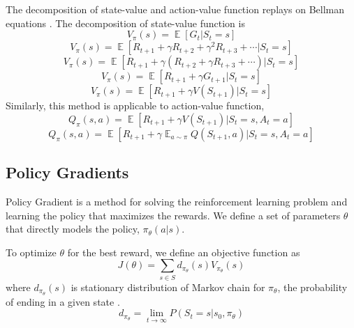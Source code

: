         The decomposition of state-value and action-value function replays on Bellman equations \cite{bellman-eq}. The decomposition of state-value function is
        \begin{equation}
            V_{\pi}(s) = \mathop{\mathbb{E}}[G_t|S_t = s]
        \end{equation}
        \begin{equation}
            V_{\pi}(s) = \mathop{\mathbb{E}}[R_{t+1} + \gamma R_{t+2} + \gamma^2 R_{t+3} + \cdots |S_t = s]
        \end{equation}
        \begin{equation}
            V_{\pi}(s) = \mathop{\mathbb{E}}[R_{t+1} + \gamma(R_{t+2} + \gamma R_{t+3} + \cdots) |S_t = s]
        \end{equation}
        \begin{equation}
            V_{\pi}(s) = \mathop{\mathbb{E}}[R_{t+1} + \gamma G_{t+1} |S_t = s]
        \end{equation}
        \begin{equation}
            V_{\pi}(s) = \mathop{\mathbb{E}}[R_{t+1} + \gamma V(S_{t+1}) |S_t = s]
        \end{equation}
        Similarly, this method is applicable to action-value function,
        \begin{equation}
            Q_{\pi}(s, a) = \mathop{\mathbb{E}}[R_{t+1} + \gamma V(S_{t+1}) |S_t = s, A_t = a]
        \end{equation}
        \begin{equation}
            Q_{\pi}(s, a) = \mathop{\mathbb{E}}[R_{t+1} + \gamma \mathop{\mathbb{E}}_{a \sim \pi} Q(S_{t+1}, a) |S_t = s, A_t = a]
        \end{equation}
    
        \subsection{Policy Gradients}
        Policy Gradient \cite{policy-gradient} is a method for solving the reinforcement learning problem and learning the policy that maximizes the rewards. We define a set of parameters $\theta$ that directly models the policy, $\pi_{\theta}(a|s)$.
    
        To optimize $\theta$ for the best reward, we define an objective function \cite{policy-gradient} as
        \begin{equation}
            J(\theta) = \sum_{s \in S} d_{\pi_{\theta}}(s)V_{\pi_{\theta}}(s)
        \end{equation}
        where $d_{\pi_{\theta}}(s)$ is stationary distribution of Markov chain for $\pi_{\theta}$, the probability of ending in a given state \cite{markov-bullshit}.
        \begin{equation}
            d_{\pi_{\theta}} = \lim_{t \longrightarrow \infty} P(S_t = s | s_0, \pi_{\theta})
        \end{equation}
        
